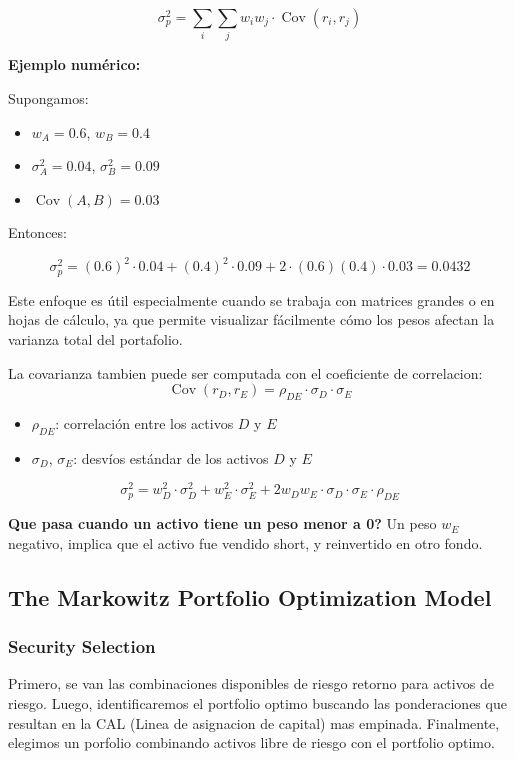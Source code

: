 \documentclass{article}
\begin{document}
\[
\sigma_p^2 = \sum_i \sum_j w_i w_j \cdot \operatorname{Cov}(r_i, r_j)
\]

\bigskip

\textbf{Ejemplo numérico:}

Supongamos:
\begin{itemize}
    \item \( w_A = 0.6 \), \( w_B = 0.4 \)
    \item \( \sigma_A^2 = 0.04 \), \( \sigma_B^2 = 0.09 \)
    \item \( \operatorname{Cov}(A, B) = 0.03 \)
\end{itemize}

Entonces:

\[
\sigma_p^2 = (0.6)^2 \cdot 0.04 + (0.4)^2 \cdot 0.09 + 2 \cdot (0.6)(0.4) \cdot 0.03 = 0.0432
\]

\bigskip

Este enfoque es útil especialmente cuando se trabaja con matrices grandes o en hojas de cálculo, ya que permite visualizar fácilmente cómo los pesos afectan la varianza total del portafolio.

\bigskip

La covarianza tambien puede ser computada con el coeficiente de correlacion:
\[
\operatorname{Cov}(r_D, r_E) = \rho_{DE} \cdot \sigma_D \cdot \sigma_E \tag{7.6}
\]
\begin{itemize}
  \item \( \rho_{DE} \): correlación entre los activos \( D \) y \( E \)
  \item \( \sigma_D \), \( \sigma_E \): desvíos estándar de los activos \( D \) y \( E \)
\end{itemize}

\[
\sigma_p^2 = w_D^2 \cdot \sigma_D^2 + w_E^2 \cdot \sigma_E^2 + 2 w_D w_E \cdot \sigma_D \cdot \sigma_E \cdot \rho_{DE}
\]

\textbf{Que pasa cuando un activo tiene un peso menor a 0?}
Un peso $w_E$ negativo, implica que el activo fue vendido short, y reinvertido en otro fondo. 

\subsection{The Markowitz Portfolio Optimization Model}
\subsubsection{Security Selection}
Primero, se van las combinaciones disponibles de riesgo retorno para activos de riesgo. Luego, identificaremos el 
portfolio optimo buscando las ponderaciones que resultan en la CAL (Linea de asignacion de capital) mas empinada. 
Finalmente, elegimos un porfolio combinando activos libre de riesgo con el portfolio optimo.
\end{document}
